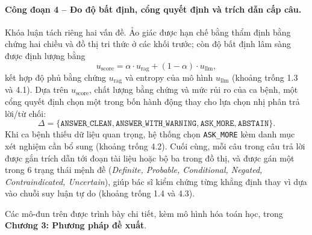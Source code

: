 \paragraph{Công đoạn 4 -- Đo độ bất định, cổng quyết định và trích dẫn cấp câu.}
Khóa luận tách riêng hai vấn đề. Ảo giác được hạn chế bằng thẩm định bằng chứng hai chiều và đồ thị tri thức ở các khối trước; còn độ bất định lâm sàng được định lượng bằng
\begin{equation}
    u_{\mathrm{score}} = \alpha \cdot u_{\mathrm{rag}} + (1-\alpha) \cdot u_{\mathrm{llm}},
\end{equation}
kết hợp độ phủ bằng chứng $u_{\mathrm{rag}}$ và entropy của mô hình $u_{\mathrm{llm}}$ (khoảng trống 1.3 và 4.1). Dựa trên $u_{\mathrm{score}}$, chất lượng bằng chứng và mức rủi ro của ca bệnh, một cổng quyết định chọn một trong bốn hành động thay cho lựa chọn nhị phân trả lời/từ chối:
\begin{equation}
    \Delta = \{\texttt{ANSWER\_CLEAN}, \texttt{ANSWER\_WITH\_}\allowbreak\texttt{WARNING}, \texttt{ASK\_MORE}, \texttt{ABSTAIN}\}.
\end{equation}
Khi ca bệnh thiếu dữ liệu quan trọng, hệ thống chọn \texttt{ASK\_MORE} kèm danh mục xét nghiệm cần bổ sung (khoảng trống 4.2). Cuối cùng, mỗi câu trong câu trả lời được gắn trích dẫn tới đoạn tài liệu hoặc bộ ba trong đồ thị, và được gán một trong 6 trạng thái mệnh đề (\emph{Definite, Probable, Conditional, Negated, Contraindicated, Uncertain}), giúp bác sĩ kiểm chứng từng khẳng định thay vì dựa vào chuỗi suy luận tự do (khoảng trống 1.4 và 4.3).

Các mô-đun trên được trình bày chi tiết, kèm mô hình hóa toán học, trong \textbf{Chương 3: Phương pháp đề xuất}.
